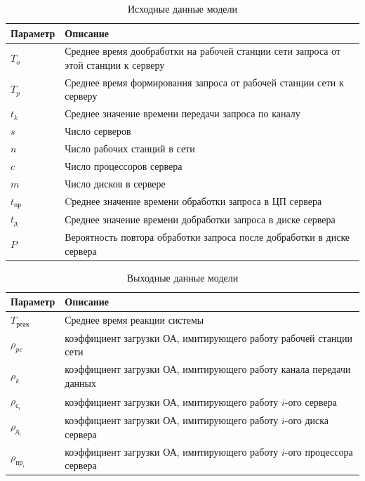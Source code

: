 \documentclass[russian,utf8,emptystyle]{eskdtext}
\begin{document}
\begin{longtable}{p{2cm}|p{15cm}}
\caption{Исходные данные модели}
\label{tab:anal-input} 
\\
Параметр & Описание \\
\hline
$T_o$ & Среднее время дообработки на рабочей станции сети запроса от этой станции к серверу \\
$T_p$ & Среднее время формирования запроса от рабочей станции сети к серверу \\
$t_k$ & Среднее значение времени передачи запроса по каналу \\
$s$   & Число серверов \\
$n$   & Число рабочих станций в сети \\
$c$	  & Число процессоров сервера \\
$m$   & Число дисков в сервере \\
$t_\text{пр}$ & Cреднее значение времени обработки запроса в ЦП сервера \\
$t_\text{д}$ & Среднее значение времени добработки запроса в диске сервера \\
$P$ & Вероятность повтора обработки запроса после добработки в диске сервера \\
\end{longtable}

\clearpage
\begin{longtable}{p{2cm}|p{15cm}}
\caption{Выходные данные модели}
\label{tab:anal-input} 
\\
Параметр & Описание \\
\hline
$T_\text{реак}$ & Среднее время реакции системы \\
$\rho_{pc}$ & коэффициент загрузки ОА, имитирующего работу рабочей станции сети \\
$\rho_k$ & коэффициент загрузки ОА, имитирующего работу канала передачи данных \\
$\rho_{\text{с}_i}$ & коэффициент загрузки ОА, имитирующего работу $i$-ого сервера \\
$\rho_{\text{д}_i}$ & коэффициент загрузки ОА, имитирующего работу $i$-ого диска сервера \\
$\rho_{\text{пр}_i}$ & коэффициент загрузки ОА, имитирующего работу $i$-ого процессора сервера \\
\end{longtable}
\end{document}
